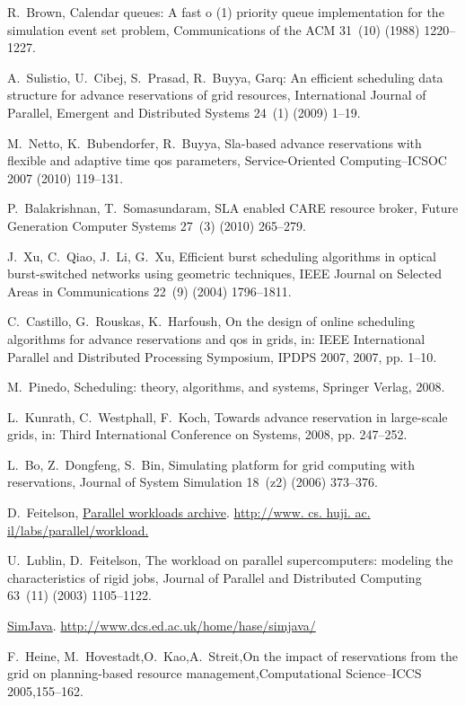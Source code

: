 \documentclass[preprint,12pt]{elsarticle}
\begin{document}
\begin{thebibliography}{10}
R.~Brown, Calendar queues: A fast o (1) priority queue implementation for the
  simulation event set problem, Communications of the ACM 31~(10) (1988)
  1220--1227.

A.~Sulistio, U.~Cibej, S.~Prasad, R.~Buyya, Garq: An efficient scheduling data
  structure for advance reservations of grid resources, International Journal
  of Parallel, Emergent and Distributed Systems 24~(1) (2009) 1--19.

M.~Netto, K.~Bubendorfer, R.~Buyya, Sla-based advance reservations with
  flexible and adaptive time qos parameters, Service-Oriented Computing--ICSOC
  2007 (2010) 119--131.

P.~Balakrishnan, T.~Somasundaram, {SLA enabled CARE resource broker}, Future
  Generation Computer Systems 27~(3) (2010) 265--279.

J.~Xu, C.~Qiao, J.~Li, G.~Xu, Efficient burst scheduling algorithms in optical
  burst-switched networks using geometric techniques, IEEE Journal on Selected
  Areas in Communications 22~(9) (2004) 1796--1811.

C.~Castillo, G.~Rouskas, K.~Harfoush, On the design of online scheduling
  algorithms for advance reservations and qos in grids, in: IEEE International
  Parallel and Distributed Processing Symposium, IPDPS 2007, 2007, pp. 1--10.

M.~Pinedo, {Scheduling: theory, algorithms, and systems}, Springer Verlag,
  2008.

L.~Kunrath, C.~Westphall, F.~Koch, Towards advance reservation in large-scale
  grids, in: Third International Conference on Systems, 2008, pp. 247--252.

L.~Bo, Z.~Dongfeng, S.~Bin, Simulating platform for grid computing with
  reservations, Journal of System Simulation 18~(z2) (2006) 373--376.

D.~Feitelson, \href{http://www. cs. huji. ac.
  il/labs/parallel/workload.}{Parallel workloads archive}.
\newline\urlprefix\url{http://www. cs. huji. ac. il/labs/parallel/workload.}

U.~Lublin, D.~Feitelson, The workload on parallel supercomputers: modeling the
  characteristics of rigid jobs, Journal of Parallel and Distributed Computing
  63~(11) (2003) 1105--1122.

\href{http://www.dcs.ed.ac.uk/home/hase/simjava/}{SimJava}.
\newline\urlprefix\url{http://www.dcs.ed.ac.uk/home/hase/simjava/}




F.~Heine, M.~Hovestadt,O.~Kao,A.~Streit,On the impact of reservations from the grid on planning-based resource management,Computational Science--ICCS 2005,155--162.




\end{thebibliography}
\end{document}
